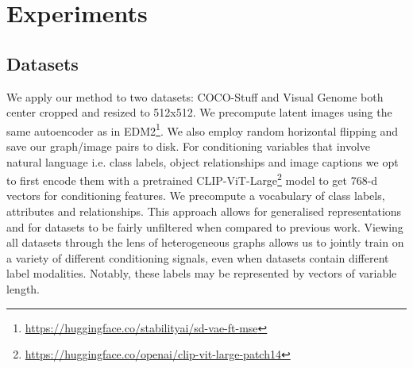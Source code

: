 \section{Experiments}
\label{sec:experiments}



\subsection{Datasets}
We apply our method to two datasets: COCO-Stuff and Visual Genome both center cropped and resized to 512x512. We precompute latent images using the same autoencoder as in EDM2\footnote{\href{https://huggingface.co/stabilityai/sd-vae-ft-mse}{https://huggingface.co/stabilityai/sd-vae-ft-mse}}. We also employ random horizontal flipping and save our graph/image pairs to disk. For conditioning variables that involve natural language i.e. class labels, object relationships and image captions we opt to first encode them with a pretrained CLIP-ViT-Large\footnote{\href{https://huggingface.co/openai/clip-vit-large-patch14}{https://huggingface.co/openai/clip-vit-large-patch14}} model to get 768-d vectors for conditioning features. We precompute a vocabulary of class labels, attributes and relationships. This approach allows for generalised representations and for datasets to be fairly unfiltered when compared to previous work. Viewing all datasets through the lens of heterogeneous graphs allows us to jointly train on a variety of different conditioning signals, even when datasets contain different label modalities. Notably, these labels may be represented by vectors of variable length. 

